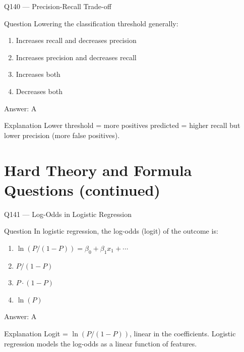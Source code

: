 \documentclass[aspectratio=169,8pt]{beamer}
\begin{document}
	\begin{frame}{Q140 --- Precision-Recall Trade-off}
		\begin{block}{Question}
			Lowering the classification threshold generally:
			\begin{enumerate}
				\item Increases recall and decreases precision
				\item Increases precision and decreases recall
				\item Increases both
				\item Decreases both
			\end{enumerate}
		\end{block}
		\begin{exampleblock}{Answer: A}\end{exampleblock}
		\begin{block}{Explanation}
			Lower threshold = more positives predicted = higher recall but lower precision (more false positives).
		\end{block}
	\end{frame}
	
	\section{Hard Theory and Formula Questions (continued)}
	
	\begin{frame}{Q141 --- Log-Odds in Logistic Regression}
		\begin{block}{Question}
			In logistic regression, the log-odds (logit) of the outcome is:
			\begin{enumerate}
				\item $\ln(P/(1-P)) = \beta_0 + \beta_1 x_1 + \cdots$
				\item $P/(1-P)$
				\item $P \cdot (1-P)$
				\item $\ln(P)$
			\end{enumerate}
		\end{block}
		\begin{exampleblock}{Answer: A}\end{exampleblock}
		\begin{block}{Explanation}
			Logit = $\ln(P/(1-P))$, linear in the coefficients. Logistic regression models the log-odds as a linear function of features.
		\end{block}
	\end{frame}
	
\end{document}
